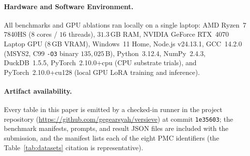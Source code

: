 \documentclass{article}
\begin{document}
\begin{table}[t]
\caption{Public benchmark corpus ($1{,}207$ documents; $826$ unsafe, $381$ safe under format-validated labeling).}
\label{tab:datasets}
\vskip 0.08in
\begin{center}
\end{center}
\vskip -0.14in
\end{table}

\paragraph{Hardware and Software Environment.}
All benchmarks and GPU ablations ran locally on a single laptop: AMD Ryzen~7 7840HS ($8$ cores / $16$ threads), $31.3$\,GB RAM, NVIDIA GeForce RTX~4070 Laptop GPU ($8$\,GB VRAM), Windows~11 Home, Node.js v24.13.1, GCC~14.2.0 (MSYS2, C99 \texttt{-O3} binary $135{,}025$\,B), Python~3.12.4, NumPy~2.4.3, DuckDB~1.5.5, PyTorch~2.10.0+cpu (CPU substrate trials), and PyTorch~2.10.0+cu128 (local GPU LoRA training and inference).

\paragraph{Artifact availability.}
Every table in this paper is emitted by a checked-in runner in the project repository (\url{https://github.com/gegearsyah/versieve}) at commit \texttt{1e35603}; the benchmark manifests, prompts, and result JSON files are included with the submission, and the manifest lists each of the eight PMC identifiers (the Table~\ref{tab:datasets} citation is representative).
\end{document}
